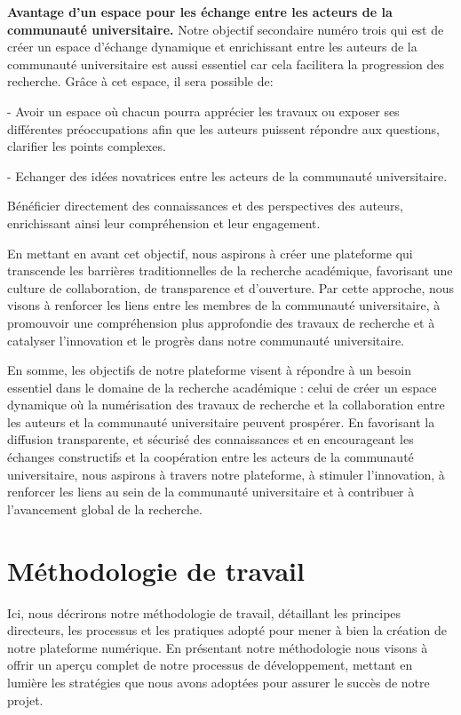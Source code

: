 \textbf{Avantage d'un espace pour les échange entre les acteurs de la communauté universitaire.}
Notre objectif secondaire numéro trois qui est de créer un espace d'échange dynamique et enrichissant entre les auteurs de la communauté universitaire est aussi essentiel car cela facilitera la progression des recherche.
Grâce à cet espace, il sera possible de: \par 

	- Avoir un espace où chacun pourra apprécier les travaux ou exposer ses différentes préoccupations afin que les auteurs puissent répondre aux questions, clarifier les points complexes.\par
	- Echanger des idées novatrices entre les acteurs de la communauté universitaire.\par
	Bénéficier directement des connaissances et des perspectives des auteurs, enrichissant ainsi leur compréhension et leur engagement.\par

En mettant en avant cet objectif, nous aspirons à créer une plateforme qui transcende les barrières traditionnelles de la recherche académique, favorisant une culture de collaboration, de transparence et d'ouverture. Par cette approche, nous visons à renforcer les liens entre les membres de la communauté universitaire, à promouvoir une compréhension plus approfondie des travaux de recherche et à catalyser l'innovation et le progrès dans notre communauté universitaire.\par

En somme, les objectifs de notre plateforme visent à répondre à un besoin essentiel dans le domaine de la recherche académique : celui de créer un espace dynamique où la numérisation des travaux de recherche et la collaboration entre les auteurs et la communauté universitaire peuvent prospérer. En favorisant la diffusion transparente, et sécurisé des connaissances et en encourageant les échanges constructifs et la coopération entre les acteurs de la communauté universitaire, nous aspirons à travers notre plateforme, à stimuler l'innovation, à renforcer les liens au sein de la communauté universitaire et à contribuer à l'avancement global de la recherche. 

\section{Méthodologie de travail}
Ici, nous décrirons notre méthodologie de travail, détaillant les principes directeurs, les processus et les pratiques adopté pour mener à bien la création de notre plateforme numérique. En présentant notre méthodologie nous visons à offrir un aperçu complet de notre processus de développement, mettant en lumière les stratégies que nous avons adoptées pour assurer le succès de notre projet.


